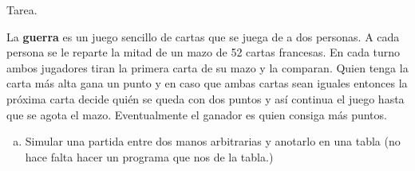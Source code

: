 \documentclass{beamer}
\begin{document}
\begin{frame}[fragile]{Tarea.}
  
La \textbf{guerra} es un juego sencillo de cartas que se juega de a dos personas.
A cada persona se le reparte la mitad de un mazo de 52 cartas francesas. 
En cada turno ambos jugadores tiran la primera carta de su mazo y la comparan. 
Quien tenga la carta más alta gana un punto y en caso que ambas cartas sean iguales entonces la próxima carta decide quién se queda con dos puntos y así continua el juego hasta que se agota el mazo. Eventualmente el ganador es quien consiga más puntos.





\begin{enumerate}[a)]
  \item Simular una partida entre dos manos arbitrarias y anotarlo en una tabla (no hace falta hacer un programa que nos de la tabla.)
\end{enumerate}
\end{frame}
\end{document}

